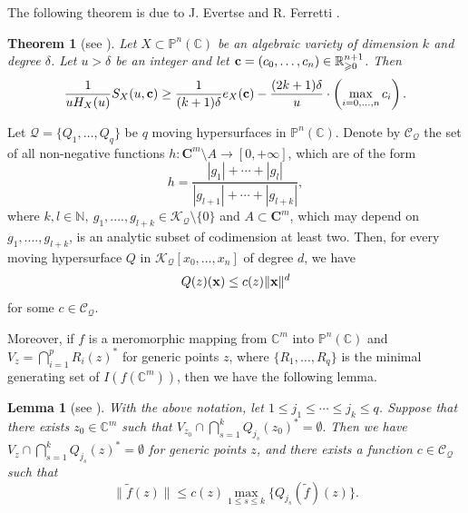 \documentclass[12pt,leqno]{amsart}
\newtheorem{lemma}[equation]{Lemma}
\newtheorem{theorem}[equation]{Theorem}
\newcommand{\C}{{\mathbb{C}}}
\newcommand{\N}{\mathbb{N}}
\renewcommand{\P}{{\mathbb{P}}}
\numberwithin{equation}{section}
\begin{document}
The following theorem is due to J. Evertse and R. Ferretti \cite{EF1}.
\begin{theorem}[{see \cite[Theorem 4.1]{EF1}}]\label{2.1}
Let $X\subset\P^n(\C)$ be an algebraic variety of dimension $k$ and degree $\delta$. Let $u>\delta$ be an integer and let ${\bf c}=(c_0,\ldots,c_n)\in\mathbb R^{n+1}_{\geqslant 0}$.
Then
$$ \dfrac{1}{uH_X(u)}S_X(u,{\bf c})\ge\dfrac{1}{(k+1)\delta}e_X({\bf c})-\dfrac{(2k+1)\delta}{u}\cdot\left (\max_{i=0,\ldots,n}c_i\right).$$
\end{theorem}


Let $\mathcal Q=\{Q_1,\ldots,Q_q\}$ be $q$ moving hypersurfaces in $\P^n(\C)$. Denote by $\mathcal C_{\mathcal Q}$ the set of all non-negative functions $h : \mathbf{C}^m\setminus A\longrightarrow [0,+\infty]$, which are of the form
$$ h=\dfrac{|g_1|+\cdots +|g_l|}{|g_{l+1}|+\cdots +|g_{l+k}|}, $$
where $k,l\in\N,\ g_1,...., g_{l+k}\in\mathcal K_{\mathcal Q}\setminus\{0\}$ and $A\subset\mathbf{C}^m$, which may depend on
$g_1,....,g_{l+k}$, is an analytic subset of codimension at least two. Then, for every moving hypersurface $Q$ in $\mathcal K_{\mathcal Q}[x_0,\ldots,x_n]$ of degree $d$, we have
$$ Q(z)({\bf x})\le c(z)\|{\bf x}\|^d $$
for some $c\in\mathcal C_{\mathcal Q}$.

Moreover, if $f$ is a meromorphic mapping from $\C^m$ into $\P^n(\C)$ and $V_z=\bigcap_{i=1}^pR_i(z)^*$ for generic points $z$, where $\{R_1,\ldots,R_q\}$ is the minimal generating set of $I(f(\C^m))$, then we have the following lemma. 

\begin{lemma}[{see \cite[Lemma 3.2]{Q22c}}]\label{2.4}
With the above notation, let $1\le j_1\le\cdots\le j_k\le q$. Suppose that there exists $z_0\in\C^m$ such that $V_{z_0}\cap\bigcap_{s=1}^kQ_{j_s}(z_0)^*=\emptyset.$ Then we have $V_z\cap\bigcap_{s=1}^kQ_{j_s}(z)^*=\emptyset$ for generic points $z$, and there exists a function $c\in\mathcal C_{\mathcal Q}$ such that
$$ \|\tilde f(z)\|\le c(z)\max_{1\le s\le k}\{Q_{j_s}(\tilde f)(z)\}.$$
\end{lemma}
\end{document}
